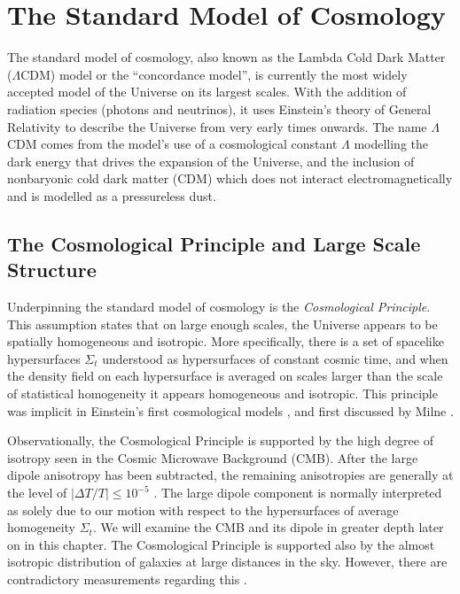\documentclass[a4paper,12pt]{report}
\begin{document}
\section{The Standard Model of Cosmology}
The standard model of cosmology, also known as the Lambda Cold Dark Matter ($\Lambda$CDM) model or the ``concordance model'', is currently the most widely accepted model of the Universe on its largest scales. With the addition of radiation species (photons and neutrinos), it uses Einstein's theory of General Relativity to describe the Universe from very early times onwards. The name $\Lambda$CDM comes from the model's use of a cosmological constant $\Lambda$ modelling the dark energy that drives the expansion of the Universe, and the inclusion of nonbaryonic cold dark matter (CDM) which does not interact electromagnetically and is modelled as a pressureless dust.

\subsection{The Cosmological Principle and Large Scale Structure}
Underpinning the standard model of cosmology is the \textit{Cosmological Principle}. This assumption states that on large enough scales, the Universe appears to be spatially homogeneous and isotropic. More specifically, there is a set of spacelike hypersurfaces $\Sigma_t$ understood as hypersurfaces of constant cosmic time, and when the density field on each hypersurface is averaged on scales larger than the scale of statistical homogeneity it appears homogeneous and isotropic. This principle was implicit in Einstein's first cosmological models \cite{RN44}, and first discussed by Milne \cite{RN43}.

Observationally, the Cosmological Principle is supported by the high degree of isotropy seen in the Cosmic Microwave Background (CMB). After the large dipole anisotropy has been subtracted, the remaining anisotropies are generally at the level of $|\Delta T/T|\leq 10^{-5}$ \cite{RN54}. The large dipole component is normally interpreted as solely due to our motion with respect to the hypersurfaces of average homogeneity $\Sigma_t$. We will examine the CMB and its dipole in greater depth later on in this chapter. The Cosmological Principle is supported also by the almost isotropic distribution of galaxies at large distances in the sky. However, there are contradictory measurements regarding this \cite{RN151,RN51,RN152,RN52,RN53,RN202,RN49,RN50}.
\end{document}
